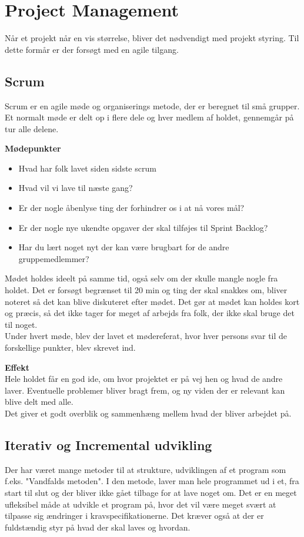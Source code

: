 \newpage
\section{Project Management}

Når et projekt når en vis størrelse, bliver det nødvendigt med projekt styring. Til dette formår er der forsøgt med en agile tilgang.\\


\subsection{Scrum}

Scrum er en agile møde og organiserings metode, der er beregnet til små grupper. Et normalt møde er delt op i flere dele og hver medlem af holdet, gennemgår på tur alle delene.

\textbf{Mødepunkter}
\begin{itemize}
	\item Hvad har folk lavet siden sidste scrum
	\item Hvad vil vi lave til næste gang?
	\item Er der nogle åbenlyse ting der forhindrer os i at nå vores mål?
	\item Er der nogle nye ukendte opgaver der skal tilføjes til Sprint Backlog?
	\item Har du lært noget nyt der kan være brugbart for de andre gruppemedlemmer?
\end{itemize}

Mødet holdes ideelt på samme tid, også selv om der skulle mangle nogle fra holdet. Det er forsøgt begrænset til 20 min og ting der skal snakkes om, bliver noteret så det kan blive diskuteret efter mødet.
Det gør at mødet kan holdes kort og præcis, så det ikke tager for meget af arbejds fra folk, der ikke skal bruge det til noget.\\

Under hvert møde, blev der lavet et mødereferat, hvor hver persons svar til de forskellige punkter, blev skrevet ind.

\textbf{Effekt}\\

Hele holdet får en god ide, om hvor projektet er på vej hen og hvad de andre laver. Eventuelle problemer bliver bragt frem, og ny viden der er relevant kan blive delt med alle.\\
Det giver et godt overblik og sammenhæng mellem hvad der bliver arbejdet på.


\subsection{Iterativ og Incremental udvikling}
Der har været mange metoder til at strukture, udviklingen af et program som f.eks. "Vandfalds metoden". I den metode, laver man hele programmet ud i et, fra start til slut og der bliver ikke gået tilbage for at lave noget om. Det er en meget ufleksibel måde at udvikle et program på, hvor det vil være meget svært at tilpasse sig ændringer i kravspecifikationerne. Det kræver også at der er fuldstændig styr på hvad der skal laves og hvordan.\\

